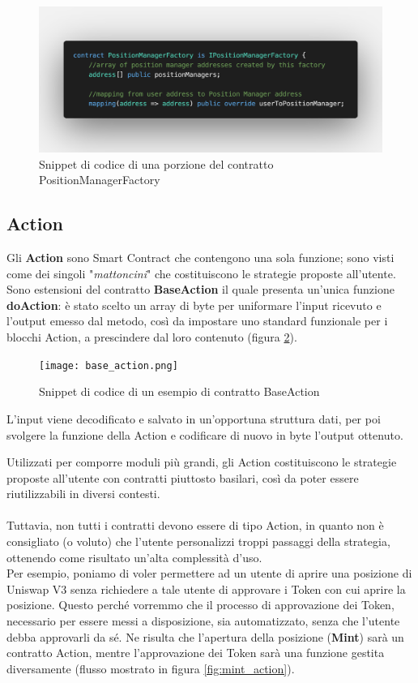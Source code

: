\documentclass[12pt,a4paper]{report}
\begin{document}
\begin{figure}[H]
  \includegraphics[scale=0.32]{factory_snippet.png}
  \centering
  \caption{Snippet di codice di una porzione del contratto PositionManagerFactory}
  \label{fig:factory_snippet}
\end{figure}


\subsection{Action}

Gli \textbf{Action} sono Smart Contract che contengono una sola funzione; sono visti come dei singoli "\textit{mattoncini}" che costituiscono le strategie proposte all'utente.
\\Sono estensioni del contratto \textbf{BaseAction} il quale presenta un'unica funzione \textbf{doAction}: è stato scelto un array di byte per uniformare l'input ricevuto e l'output emesso dal metodo, così da impostare uno standard funzionale per i blocchi Action, a prescindere dal loro contenuto (figura \ref{fig:base_action}).

\begin{figure}[H]
  \texttt{[image: base\_action.png]}
  \centering
  \caption{Snippet di codice di un esempio di contratto BaseAction}
  \label{fig:base_action}
\end{figure}

\noindent L'input viene decodificato e salvato in un'opportuna struttura dati, per poi svolgere la funzione della Action e codificare di nuovo in byte l'output ottenuto.


\noindent Utilizzati per comporre moduli più grandi, gli Action costituiscono le strategie proposte all'utente con contratti piuttosto basilari, così da poter essere riutilizzabili in diversi contesti. 
\\\\Tuttavia, non tutti i contratti devono essere di tipo Action, in quanto non è consigliato (o voluto) che l'utente personalizzi troppi passaggi della strategia, ottenendo come risultato un'alta complessità d'uso.
\\Per esempio, poniamo di voler permettere ad un utente di aprire una posizione di Uniswap V3 senza richiedere a tale utente di approvare i Token con cui aprire la posizione. Questo perché vorremmo che il processo di approvazione dei Token, necessario per essere messi a disposizione, sia automatizzato, senza che l'utente debba approvarli da sé. Ne risulta che l'apertura della posizione (\textbf{Mint}) sarà un contratto Action, mentre l'approvazione dei Token sarà una funzione gestita diversamente (flusso mostrato in figura \ref{fig:mint_action}).
\end{document}
